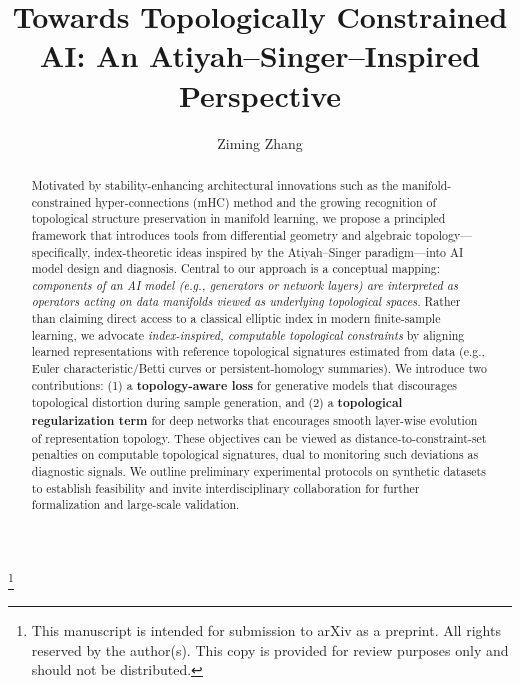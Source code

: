 \documentclass[10pt,leqno]{amsart}
\begin{document}
\title[Topologically Constrained AI]{Towards Topologically Constrained AI: An Atiyah--Singer--Inspired Perspective}
\author{Ziming Zhang}
\thanks{This manuscript is intended for submission to arXiv as a preprint. All rights reserved by the author(s). This copy is provided for review purposes only and should not be distributed.}
\address{Pix Moving (Suzhou) Co., Ltd. \\ Suzhou, China}
\maketitle

\begin{abstract}
Motivated by stability-enhancing architectural innovations such as the manifold-constrained hyper-connections (mHC) method and the growing recognition of topological structure preservation in manifold learning, we propose a principled framework that introduces tools from differential geometry and algebraic topology---specifically, index-theoretic ideas inspired by the Atiyah--Singer paradigm---into AI model design and diagnosis. Central to our approach is a conceptual mapping: \emph{components of an AI model (e.g., generators or network layers) are interpreted as operators acting on data manifolds viewed as underlying topological spaces.} Rather than claiming direct access to a classical elliptic index in modern finite-sample learning, we advocate \emph{index-inspired, computable topological constraints} by aligning learned representations with reference topological signatures estimated from data (e.g., Euler characteristic/Betti curves or persistent-homology summaries). We introduce two contributions: (1) a \textbf{topology-aware loss} for generative models that discourages topological distortion during sample generation, and (2) a \textbf{topological regularization term} for deep networks that encourages smooth layer-wise evolution of representation topology. These objectives can be viewed as distance-to-constraint-set penalties on computable topological signatures, dual to monitoring such deviations as diagnostic signals. We outline preliminary experimental protocols on synthetic datasets to establish feasibility and invite interdisciplinary collaboration for further formalization and large-scale validation.
\end{abstract}
\end{document}

